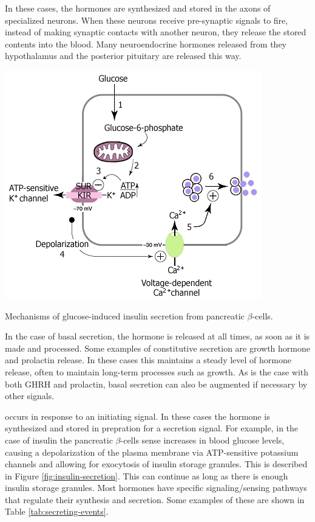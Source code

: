 \documentclass{tufte-handout}
\begin{document}
  In these cases, the hormones are synthesized and stored in the axons of specialized neurons.  When these neurons receive pre-synaptic signals to fire, instead of making synaptic contacts with another neuron, they release the stored contents into the blood.  Many neuroendocrine hormones released from they hypothalamus and the posterior pituitary are released this way.

\begin{marginfigure}
  \includegraphics{figures/insulin-secretion}
  \caption{Mechanisms of glucose-induced insulin secretion from pancreatic $\beta$-cells.}
    \label{fig:insulin-secretion}
\end{marginfigure}

  In the case of basal secretion, the hormone is released at all times, as soon as it is made and processed.  Some examples of constitutive secretion are growth hormone and prolactin release.  In these cases this maintains a steady level of hormone release, often to maintain long-term processes such as growth.  As is the case with both GHRH and prolactin, basal secretion can also be augmented if necessary by other signals.

 occurs in response to an initiating signal.  In these cases the hormone is synthesized and stored in prepration for a secretion signal.  For example, in the case of insulin the pancreatic $\beta$-cells sense increases in blood glucose levels, causing a depolarization of the plasma membrane via ATP-sensitive potassium channels and allowing for exocytosis of insulin storage granules.  This is described in Figure \ref{fig:insulin-secretion}.  This can continue as long as there is enough insulin storage granules.  Most hormones have specific signaling/sensing pathways that regulate their synthesis and secretion.  Some examples of these are shown in Table \ref{tab:secreting-events}.
\end{document}
